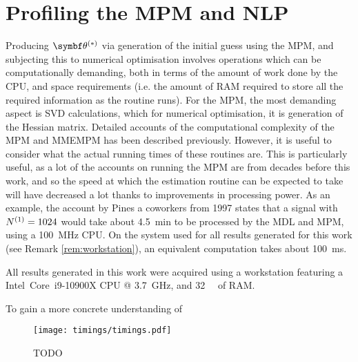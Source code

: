 \section{Profiling the \acs{MPM} and \acs{NLP}}
Producing $\bthstar$ via generation of the initial guess using the \ac{MPM},
and subjecting this to numerical optimisation involves operations which can be
computationally demanding, both in terms of the amount of work done by the
\ac{CPU}, and space requirements (i.e. the amount of \ac{RAM} required to store
all the required information as the routine runs). For the \ac{MPM}, the most
demanding aspect is \ac{SVD} calculations, which for numerical optimisation, it
is generation of the Hessian matrix. Detailed accounts of the computational
complexity of the \ac{MPM} and \ac{MMEMPM} has been described previously.
However, it is useful to consider what the actual running times of these
routines are. This is particularly useful, as a lot of the accounts on running
the \ac{MPM} are from decades before this work, and so the speed at which the
estimation routine can be expected to take will have decreased a lot thanks to
improvements in processing power. As an example, the account by Pines a
coworkers from 1997 states that a signal with $N^{(1)} = 1024$ would take about
\qty{4.5}{\minute} to be processed by the \ac{MDL} and \ac{MPM}, using a
\qty{100}{\mega\hertz} \ac{CPU}\cite{Lin1997}. On the system used for all
results generated for this work (see Remark \ref{rem:workstation}), an
equivalent computation takes about \qty{100}{\milli\second}.
\begin{remark}
    \label{rem:workstation}
    All results generated in this work were acquired using a workstation
    featuring a Intel\textregistered\ Core\texttrademark\ i9-10900X CPU @
    \qty{3.7}{\giga\hertz}, and \qty{32}{\gibi\byte} of RAM.
\end{remark}

To gain a more concrete understanding
of

\begin{figure}
    \texttt{[image: timings/timings.pdf]}
    \caption{TODO}
    \label{fig:profiling}
\end{figure}

